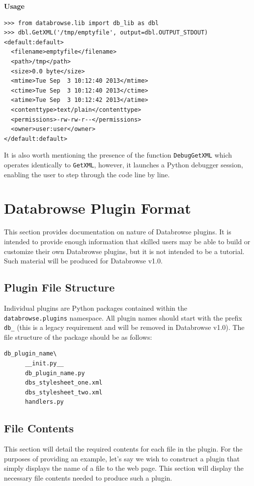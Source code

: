 \documentclass[10pt]{article}
\begin{document}
\noindent \textbf{Usage}
\begin{changemargin}{0.25in}{0in}
\begin{verbatim}
>>> from databrowse.lib import db_lib as dbl
>>> dbl.GetXML('/tmp/emptyfile', output=dbl.OUTPUT_STDOUT)
<default:default>
  <filename>emptyfile</filename>
  <path>/tmp</path>
  <size>0.0 byte</size>
  <mtime>Tue Sep  3 10:12:40 2013</mtime>
  <ctime>Tue Sep  3 10:12:40 2013</ctime>
  <atime>Tue Sep  3 10:12:42 2013</atime>
  <contenttype>text/plain</contenttype>
  <permissions>-rw-rw-r--</permissions>
  <owner>user:user</owner>
</default:default>
\end{verbatim}
\end{changemargin}

It is also worth mentioning the presence of the function \texttt{DebugGetXML} which operates identically to \texttt{GetXML}, however, it launches a Python debugger session, enabling the user to step through the code line by line.

\clearpage
\section{Databrowse Plugin Format}
This section provides documentation on nature of Databrowse plugins.  It is intended to provide enough information that skilled users may be able to build or customize their own Databrowse plugins, but it is not intended to be a tutorial.  Such material will be produced for Databrowse v1.0.

\subsection{Plugin File Structure}
Individual plugins are Python packages contained within the \texttt{databrowse.plugins} namespace.  All plugin names should start with the prefix \texttt{db\_} (this is a legacy requirement and will be removed in Databrowse v1.0).  The file structure of the package should be as follows:

\begin{verbatim}
db_plugin_name\
      __init.py__
      db_plugin_name.py
      dbs_stylesheet_one.xml
      dbs_stylesheet_two.xml
      handlers.py
\end{verbatim}

\subsection{File Contents}
This section will detail the required contents for each file in the plugin.  For the purposes of providing an example, let's say we wish to construct a plugin that simply displays the name of a file to the web page.  This section will display the necessary file contents needed to produce such a plugin.
\end{document}
